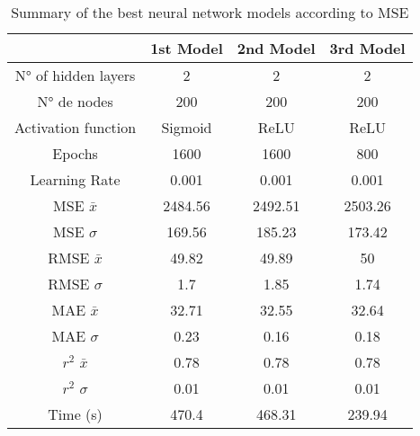 \documentclass[conference]{IEEEtran}
\begin{document}
\begin{table}[!t]
\renewcommand{\arraystretch}{1.3}
\caption{Summary of the best neural network models according to MSE}
\label{table6}
\centering
\begin{tabular}{c || c || c || c }
\hline
\bfseries 		 & \bfseries 1st Model 	& \bfseries 2nd Model 	& \bfseries 3rd Model  	\\

\hline\hline


N° of hidden layers     	&     2    &     2     &     2     \\
N° de nodes    	 		&     200    &     200     &     200     \\
Activation function     	&     Sigmoid    &     ReLU     &     ReLU     \\
Epochs     			&     1600    &     1600     &     800     \\
Learning Rate     		&     0.001    &     0.001     &     0.001     \\
MSE $\bar{x}$     		&     ﻿2484.56    &     ﻿2492.51     &     ﻿2503.26     \\
MSE $\sigma$     		&     169.56    &     185.23     &     173.42     \\
RMSE $\bar{x}$     		&     49.82    &     49.89     &     50     \\
RMSE $\sigma$    		&     1.7    &     1.85     &     1.74     \\
MAE $\bar{x}$     		&     32.71    &     32.55     &     32.64     \\
MAE $\sigma$     		&     0.23    &     0.16     &     0.18     \\
$r^{2}$ $\bar{x}$     			&     0.78    &     0.78     &     0.78     \\
$r^{2}$ $\sigma$     			&     0.01    &     0.01     &     0.01     \\
Time (s)     			&     470.4    &     468.31     &     239.94     \\

\hline
\end{tabular}
\end{table}
\end{document}
